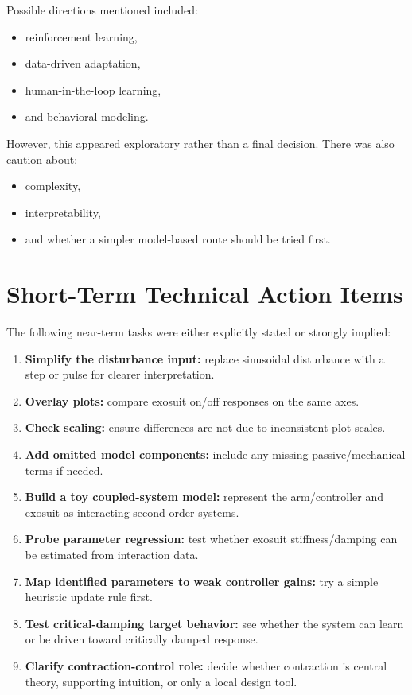 \documentclass[11pt]{article}
\begin{document}
Possible directions mentioned included:
\begin{itemize}[leftmargin=1.5em]
    \item reinforcement learning,
    \item data-driven adaptation,
    \item human-in-the-loop learning,
    \item and behavioral modeling.
\end{itemize}

However, this appeared exploratory rather than a final decision. There was also caution about:
\begin{itemize}[leftmargin=1.5em]
    \item complexity,
    \item interpretability,
    \item and whether a simpler model-based route should be tried first.
\end{itemize}

\section{Short-Term Technical Action Items}
The following near-term tasks were either explicitly stated or strongly implied:

\begin{enumerate}[leftmargin=1.5em]
    \item \textbf{Simplify the disturbance input:} replace sinusoidal disturbance with a step or pulse for clearer interpretation.
    \item \textbf{Overlay plots:} compare exosuit on/off responses on the same axes.
    \item \textbf{Check scaling:} ensure differences are not due to inconsistent plot scales.
    \item \textbf{Add omitted model components:} include any missing passive/mechanical terms if needed.
    \item \textbf{Build a toy coupled-system model:} represent the arm/controller and exosuit as interacting second-order systems.
    \item \textbf{Probe parameter regression:} test whether exosuit stiffness/damping can be estimated from interaction data.
    \item \textbf{Map identified parameters to weak controller gains:} try a simple heuristic update rule first.
    \item \textbf{Test critical-damping target behavior:} see whether the system can learn or be driven toward critically damped response.
    \item \textbf{Clarify contraction-control role:} decide whether contraction is central theory, supporting intuition, or only a local design tool.
\end{enumerate}
\end{document}
